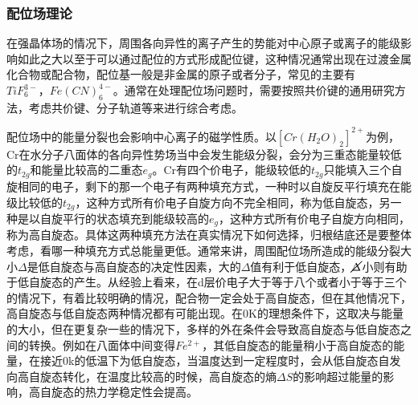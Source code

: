 \subsubsection{配位场理论}

在强晶体场的情况下，周围各向异性的离子产生的势能对中心原子或离子的能级影响如此之大以至于可以通过配位的方式形成配位键，这种情况通常出现在过渡金属化合物或配合物，配位基一般是非金属的原子或者分子，常见的主要有$TiF_{6}^{3-}\text{，}Fe(CN)_{6}^{4-}$。通常在处理配位场问题时，需要按照共价键的通用研究方法，考虑共价键、分子轨道等来进行综合考虑。

配位场中的能量分裂也会影响中心离子的磁学性质。以$[Cr(H_{2}O)_{2}]^{2+}$为例，Cr在水分子八面体的各向异性势场当中会发生能级分裂，会分为三重态能量较低的$t_{2g}$和能量比较高的二重态$e_{g}$。Cr有四个价电子，能级较低的$t_{2g}$只能填入三个自旋相同的电子，剩下的那一个电子有两种填充方式，一种时以自旋反平行填充在能级比较低的$t_{2g}$，这种方式所有价电子自旋方向不完全相同，称为低自旋态，另一种是以自旋平行的状态填充到能级较高的$e_{g}$，这种方式所有价电子自旋方向相同，称为高自旋态。具体这两种填充方法在真实情况下如何选择，归根结底还是要整体考虑，看哪一种填充方式总能量更低。通常来讲，周围配位场所造成的能级分裂大小$\Delta$是低自旋态与高自旋态的决定性因素，大的$\Delta$值有利于低自旋态，$\cancel{\Delta}$小则有助于低自旋态的产生。从经验上看来，在d层价电子大于等于八个或者小于等于三个的情况下，有着比较明确的情况，配合物一定会处于高自旋态，但在其他情况下，高自旋态与低自旋态两种情况都有可能出现。在0K的理想条件下，这取决与能量的大小，但在更复杂一些的情况下，多样的外在条件会导致高自旋态与低自旋态之间的转换。例如在八面体中间变得$Fe^{2+}$，其低自旋态的能量稍小于高自旋态的能量，在接近0k的低温下为低自旋态，当温度达到一定程度时，会从低自旋态自发向高自旋态转化，在温度比较高的时候，高自旋态的熵$\Delta S$的影响超过能量的影响，高自旋态的热力学稳定性会提高。


